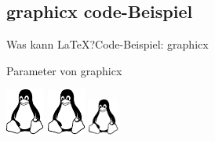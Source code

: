 \documentclass{beamer}
\begin{document}
\subsection{graphicx code-Beispiel}
\begin{frame}{Was kann \LaTeX?}{Code-Beispiel:
  graphicx}
  \begin{block}{Parameter von graphicx}
    \begin{LTXexample}[width=.3\linewidth]
      \includegraphics{tux}
      \includegraphics[scale=0.7,angle=45]{tux}
      \includegraphics[height=.8cm,width=1cm]{tux}
    \end{LTXexample}
  \end{block}
\end{frame}

\end{document}
